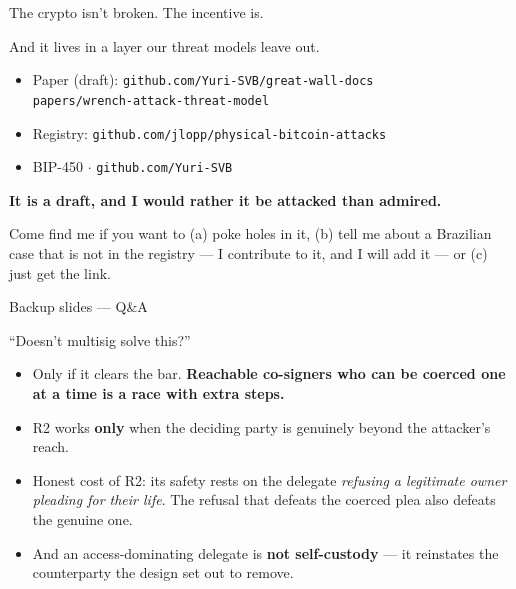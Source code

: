 \documentclass[aspectratio=169,12pt]{beamer}
\newcommand{\punch}[1]{{\color{accentdark}\bfseries #1}}
\begin{document}
\begin{frame}[t]{The crypto isn't broken. The incentive is.}
  \vspace{0.55em}
  {\small And it lives in a layer our threat models leave out.\par}
  \vspace{0.66em}
  \begin{itemize}\setlength\itemsep{0.35em}
    \item {\small Paper (draft): \texttt{github.com/Yuri-SVB/great-wall-docs}\\
      \hspace*{1.2em}\texttt{papers/wrench-attack-threat-model}}
    \item {\small Registry: \texttt{github.com/jlopp/physical-bitcoin-attacks}}
    \item {\small BIP-450 $\cdot$ \texttt{github.com/Yuri-SVB}}
  \end{itemize}
  \vspace{0.66em}
  {\color{accentdark}\large\bfseries
   It is a draft, and I would rather it be attacked than admired.\par}
  \vspace{0.50em}
  {\small Come find me if you want to (a) poke holes in it, (b) tell me about a
   Brazilian case that is not in the registry --- I contribute to it, and I will
   add it --- or (c) just get the link.}
\end{frame}

\appendix

{
\begin{frame}[plain]
  \vspace{1.76em}
  \begin{center}{\color{graytext}\Large Backup slides --- Q\&A}\end{center}
\end{frame}}

\begin{frame}[t]{``Doesn't multisig solve this?''}
  \vspace{0.55em}
  \begin{itemize}\setlength\itemsep{0.56em}
    \item {\small Only if it clears the bar. \punch{Reachable co-signers who can be
      coerced one at a time is a race with extra steps.}}
    \item {\small R2 works \textbf{only} when the deciding party is genuinely
      beyond the attacker's reach.}
    \item {\small Honest cost of R2: its safety rests on the delegate
      \emph{refusing a legitimate owner pleading for their life}. The refusal that
      defeats the coerced plea also defeats the genuine one.}
    \item {\small And an access-dominating delegate is \punch{not self-custody} ---
      it reinstates the counterparty the design set out to remove.}
  \end{itemize}
\end{frame}
\end{document}
